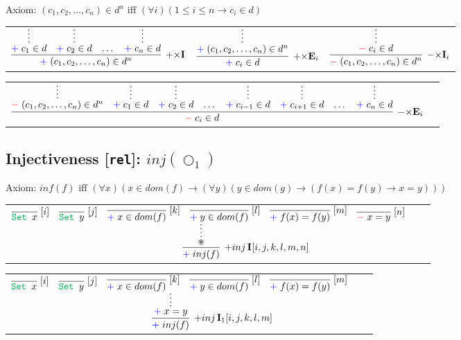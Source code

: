 \documentclass[11pt]{article}
\begin{document}
\smallskip
\noindent
Axiom: $(c_1,c_2,\dots,c_n) \in d^n\text{ iff }
(\forall i) (1\leq i
\leq n \to c_i\in d)$
\smallskip
\smallskip

\noindent
\begin{tabular}{ccc}
$
\infer[\AssertRule{\times}\Intro{}]{\Assert{\Tuple{c_1,c_2,\dots,c_n}\in d^n}}{
	\infer*{\Assert{c_1\in d}}{}
	&
	\infer*{\Assert{c_2\in d}}{}
	&
    \dots
    &
	\infer*{\Assert{c_n\in d}}{}
}
$
\hspace{0.15cm}
&
$
\infer[\AssertRule{\times}\Elim{i}]{\Assert{c_i\in d}}{
	\infer*{\Assert{\Tuple{c_1,c_2,\dots,c_n}\in d^n}}{}
}
$
\hspace{0.15cm}
&
$
\infer[\DenyRule{\times}\Intro{i}]{\Deny{\Tuple{c_1,c_2,\dots,c_n}\in d^n}}{
	\infer*{\Deny{c_i\in d}}{}
}
$
\end{tabular}
\bigskip

\noindent
\begin{tabular}{cc}
$
\infer[\DenyRule{\times}\Elim{i}]{\Deny{c_i\in d}}{
	\infer*{\Deny{\Tuple{c_1,c_2,\dots,c_n}\in d^n}}{}
	&
    \infer*{\Assert{c_1\in d}}{}
	&
	\infer*{\Assert{c_2\in d}}{}
	&
    \dots
	&
    \infer*{\Assert{c_{i-1}\in d}}{}
	&
	\infer*{\Assert{c_{i+1}\in d}}{}
	&
    \dots
    &
	\infer*{\Assert{c_n\in d}}{}
}
$
\end{tabular}
\bigskip

\newpage
\subsection*{Injectiveness [\texttt{rel}]:  $inj(\bigcirc_1)$}
\smallskip

\smallskip
\noindent
Axiom: $inf(f)\text{ iff }
(\forall x)(x \in dom(f) \to (\forall y)(y\in dom(g) \to (f(x)=f(y)\to x=y)))$
\smallskip
\smallskip

\begin{tabular}{ccc}
$
\infer[\AssertRule{inj\,}\Intro{}{[i,j,k,l,m,n]}]{\Assert{inj(f)}}{
	\infer*{\divideontimes}{
		\infer[\Label{i}]{\Set{x}}{} 
		& 
		\infer[\Label{j}]{\Set{y}}{}
		& 
		\infer[\Label{k}]{\Assert{x\in dom(f)}}{}
		& 
		\infer[\Label{l}]{\Assert{y\in dom(f)}}{}
		& 
		\infer[\Label{m}]{\Assert{f(x)= f(y)}}{}
		& 
		\infer[\Label{n}]{\Deny{x= y}}{}
	}
}
$
\end{tabular}
\bigskip

\noindent
\begin{tabular}{ccc}
$
\infer[\AssertRule{inj\,}\Intro{1}{[i,j,k,l,m]}]{\Assert{inj(f)}}{
	\infer*{\Assert{x= y}}{
		\infer[\Label{i}]{\Set{x}}{} 
		& 
		\infer[\Label{j}]{\Set{y}}{}
		& 
		\infer[\Label{k}]{\Assert{x\in dom(f)}}{}
		& 
		\infer[\Label{l}]{\Assert{y\in dom(f)}}{}
		& 
		\infer[\Label{m}]{\Assert{f(x)= f(y)}}{}
	}
}
$
\end{tabular}
\bigskip
\end{document}

